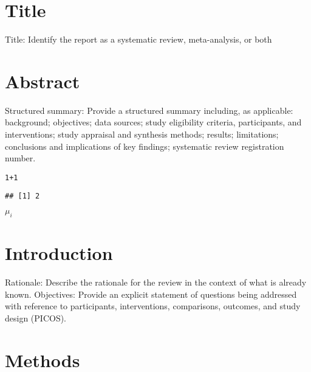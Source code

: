\documentclass{article}\usepackage[]{graphicx}\usepackage[]{color}
\makeatletter
\newcommand{\hlnum}[1]{\textcolor[rgb]{0.686,0.059,0.569}{#1}}%
\newcommand{\hlopt}[1]{\textcolor[rgb]{0,0,0}{#1}}%
\newenvironment{kframe}{%
 \def\at@end@of@kframe{}%
 \ifinner\ifhmode%
  \def\at@end@of@kframe{\end{minipage}}%
  \begin{minipage}{\columnwidth}%
 \fi\fi%
 \def\FrameCommand##1{\hskip\@totalleftmargin \hskip-\fboxsep
 \colorbox{shadecolor}{##1}\hskip-\fboxsep
     \hskip-\linewidth \hskip-\@totalleftmargin \hskip\columnwidth}%
 \MakeFramed {\advance\hsize-\width
   \@totalleftmargin\z@ \linewidth\hsize
   \@setminipage}}%
 {\par\unskip\endMakeFramed%
 \at@end@of@kframe}
\newenvironment{knitrout}{}{} %
\makeatother
\begin{document}
\section{Title}


Title: Identify the report as a systematic review, meta-analysis, or both

\section{Abstract}

Structured summary: Provide a structured summary including, as applicable: background; objectives; data sources; study eligibility criteria, participants, and interventions; study appraisal and synthesis methods; results; limitations; conclusions and implications of key findings; systematic review registration number.
\begin{knitrout}
\color{fgcolor}\begin{kframe}
\begin{alltt}
\hlnum{1}\hlopt{+}\hlnum{1}
\end{alltt}
\begin{verbatim}
## [1] 2
\end{verbatim}
\end{kframe}
\end{knitrout}
$\mu_i$

\section{Introduction}

Rationale: Describe the rationale for the review in the context of what is already known. Objectives: Provide an explicit statement of questions being addressed with reference to participants, interventions, comparisons, outcomes, and study design (PICOS).

\section{Methods}
\end{document}
